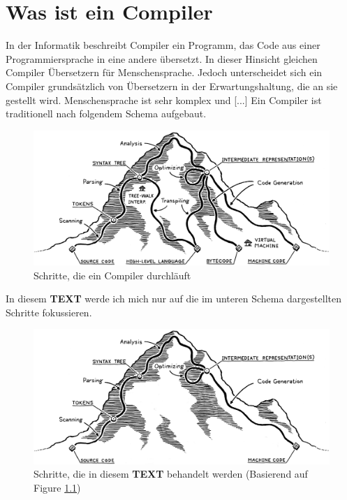 \chapter{Was ist ein Compiler}
In der Informatik beschreibt Compiler ein Programm, das Code aus einer Programmiersprache in eine andere übersetzt. In dieser Hinsicht gleichen Compiler Übersetzern für Menschensprache.
Jedoch unterscheidet sich ein Compiler grundsätzlich von Übersetzern in der Erwartungshaltung, die an sie gestellt wird. Menschensprache ist sehr komplex und [...]
\newline
\newline
Ein Compiler ist traditionell nach folgendem Schema aufgebaut.

\begin{figure}[h!]
    \centering
    \includegraphics[scale=0.15]{resources/mountain.png}
    \caption{Schritte, die ein Compiler durchläuft \cite{Compiler:Mountain}}
    \label{fig:mountain}
\end{figure}

In diesem \textbf{TEXT} werde ich mich nur auf die im unteren Schema dargestellten Schritte fokussieren.

\begin{figure}[h!]
    \centering
    \includegraphics[scale=0.15]{resources/mountain-edited.png}
    \caption{Schritte, die in diesem \textbf{TEXT} behandelt werden (Basierend auf Figure \ref{fig:mountain})}
    \label{fig:mountain-edited}
\end{figure}

